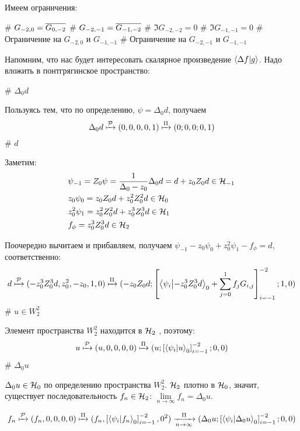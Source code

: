 Имеем ограничения:

\begin{ilist}
# $G_{-2,0} = \overline{G_{0, -2}}$
# $G_{-2,-1} = \overline{G_{-1, -2}}$
# $\Im G_{-2,-2} = 0$
# $\Im G_{-1,-1} = 0$
# Ограничение на $G_{-2, 0}$ и $G_{-1, -1}$
# Ограничение на $G_{-2, -1}$ и $G_{-1, -1}$
\end{ilist}



Напомним, что нас будет интересовать скалярное произведение $\ip{\Delta f}{g}$. Надо вложить в понтгрягинское пространство:

\begin{elist}
# $\Delta_0 d$

Пользуясь тем, что по определению, $\psi = \Delta_0 d$, получаем
\[
\Delta_0 d \xmapsto[]{\mathcal{P}} (0, 0, 0, 0, 1) \xmapsto[]{\Pi} (0; 0, 0; 0, 1)
\]
# $d$

Заметим:
\begin{align*}
& \psi_{-1} = Z_0 \psi = \frac{1}{\Delta_0 - z_0} \Delta_0 d = d + z_0 Z_0 d \in \mathcal{H}_{-1} \\
& z_0 \psi_{0} = z_0 Z_0 d + z_0^2 Z_0^2 d \in \mathcal{H}_{0} \\
& z_0^2 \psi_{1} = z_0^2 Z_0^2 d + z_0^3 Z_0^3 d \in \mathcal{H}_{1} \\
& f_\phi = z_0^3 Z_0^3 d \in \mathcal{H}_{2}
\end{align*}

Поочередно вычитаем и прибавляем, получаем  $\psi_{-1} - z_0 \psi_0 + z_0^2 \psi_1 - f_\phi =  d$, соответственно:
\[
d \xmapsto[]{\mcP} (-z_0^3 Z_0^3 d, z_0^2, -z_0, 1, 0) \xmapsto[]{\Pi} (-z_0 Z_0 d; \left[ \ip{\psi_i}{-z_0^3 Z_0^3 d}_0 + \sum\limits_{j = 0}^1 f_j G_{i, j} \right]_{i = -1}^{-2};1, 0)
\]
# $u \in W_2^2$

Элемент пространства $W_2^2$ находится в $\mathcal{H}_{2}$ , поэтому:
\[
u \xmapsto[]{\mcP} (u, 0, 0, 0, 0) \xmapsto[]{\Pi} (u;\left[ \ip{\psi_i}{u}_0 \right]_{i = -1}^{-2}; 0, 0)
\]
# $\Delta_0 u$

$\Delta_0 u \in \mathcal{H}_{0}$ по определению пространства $W_2^2$. $\mathcal{H}_{2}$ плотно в $\mathcal{H}_{0}$, значит, существует последовательность $f_n \in \mathcal{H}_{2}$: $\lim\limits_{n \to \infty} f_n = \Delta_0 u$.

\[f_n \xmapsto[]{\mcP} (f_n, 0, 0, 0, 0) \xmapsto[]{\Pi} (f_n, \left[ \ip{\psi_i}{f_n}_0 \right]_{i = -1}^{-2}, 0^2) \xrightarrow[n \to \infty]{\Pi} (\Delta_0 u; \left[ \ip{\psi_i}{\Delta_0 u}_0 \right]_{i = -1}^{-2}; 0, 0)\]
\end{elist}

